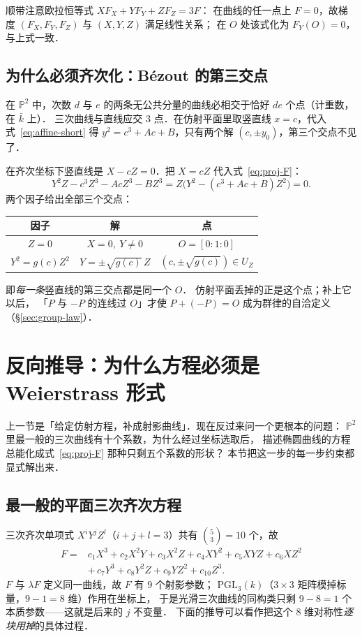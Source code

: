 \documentclass[10pt,a4paper]{article}
\numberwithin{equation}{section}
\begin{document}
顺带注意欧拉恒等式 $XF_{X}+YF_{Y}+ZF_{Z}=3F$：
在曲线的任一点上 $F=0$，故梯度 $(F_{X},F_{Y},F_{Z})$ 与 $(X,Y,Z)$ 满足线性关系；
在 $O$ 处该式化为 $F_{Y}(O)=0$，与上式一致．

\subsection{为什么必须齐次化：Bézout 的第三交点}

在 $\mathbb P^{2}$ 中，次数 $d$ 与 $e$ 的两条无公共分量的曲线必相交于恰好 $de$ 个点（计重数，在 $\bar k$ 上）．
三次曲线与直线应交 $3$ 点．在仿射平面里取竖直线 $x=c$，代入式~\eqref{eq:affine-short} 得
$y^{2}=c^{3}+Ac+B$，只有两个解 $(c,\pm y_{0})$，第三个交点不见了．

在齐次坐标下竖直线是 $X-cZ=0$．把 $X=cZ$ 代入式~\eqref{eq:proj-F}：
\[
Y^{2}Z-c^{3}Z^{3}-AcZ^{3}-BZ^{3}=Z\bigl(Y^{2}-(c^{3}+Ac+B)Z^{2}\bigr)=0 .
\]
两个因子给出全部三个交点：

\begin{center}
\begin{tabular}{c|c|c}
\hline
因子 & 解 & 点\\
\hline
$Z=0$ & $X=0,\ Y\neq0$ & $O=[0:1:0]$\\
$Y^{2}=g(c)Z^{2}$ & $Y=\pm\sqrt{g(c)}\,Z$ & $(c,\pm\sqrt{g(c)})\in U_{Z}$\\
\hline
\end{tabular}
\end{center}

即\emph{每一条}竖直线的第三交点都是同一个 $O$．
仿射平面丢掉的正是这个点；补上它以后，
「$P$ 与 $-P$ 的连线过 $O$」才使 $P+(-P)=O$ 成为群律的自洽定义
（\S\ref{sec:group-law}）．

\section{反向推导：为什么方程必须是 Weierstrass 形式}\label{sec:weierstrass-from-cubic}

上一节是「给定仿射方程，补成射影曲线」．现在反过来问一个更根本的问题：
$\mathbb P^{2}$ 里最一般的三次曲线有十个系数，为什么经过坐标选取后，
描述椭圆曲线的方程总能化成式~\eqref{eq:proj-F} 那种只剩五个系数的形状？
本节把这一步的每一步约束都显式解出来．

\subsection{最一般的平面三次齐次方程}

三次齐次单项式 $X^{i}Y^{j}Z^{l}$（$i+j+l=3$）共有 $\binom{5}{3}=10$ 个，故
\begin{equation}\label{eq:general-cubic}
\begin{aligned}
F={}&c_{1}X^{3}+c_{2}X^{2}Y+c_{3}X^{2}Z+c_{4}XY^{2}+c_{5}XYZ+c_{6}XZ^{2}\\
   &+\,c_{7}Y^{3}+c_{8}Y^{2}Z+c_{9}YZ^{2}+c_{10}Z^{3}.
\end{aligned}
\end{equation}
$F$ 与 $\lambda F$ 定义同一曲线，故 $F$ 有 $9$ 个射影参数；
$\mathrm{PGL}_{3}(k)$（$3\times3$ 矩阵模掉标量，$9-1=8$ 维）作用在坐标上，
于是光滑三次曲线的同构类只剩 $9-8=1$ 个本质参数——这就是后来的 $j$ 不变量．
下面的推导可以看作把这个 $8$ 维对称性\emph{逐块用掉}的具体过程．
\end{document}
